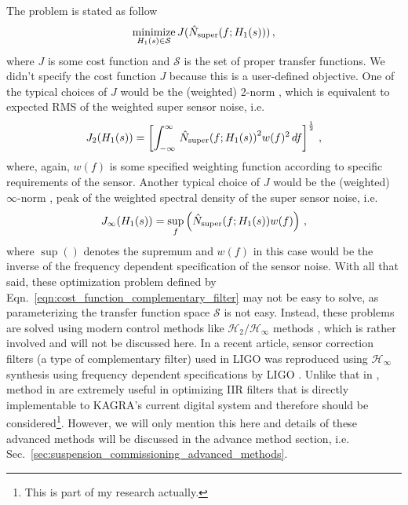 The problem is stated as follow
\begin{equation}
	\minimize_{H_1(s)\in\mathcal{S}} J(\hat{N}_\mathrm{super}\mleft(f; H_1(s)\mright))\,,
	\label{eqn:cost_function_complementary_filter}
\end{equation}
where $J$ is some cost function and $\mathcal{S}$ is the set of proper transfer functions.
We didn't specify the cost function $J$ because this is a user-defined objective.
One of the typical choices of $J$ would be the (weighted) 2-norm \cite{norms_for_signals_and_systems}, which is equivalent to expected RMS of the weighted super sensor noise, i.e.
\begin{equation}
	J_2\mleft( H_1(s) \mright) = \left[\int_{-\infty}^\infty \, \hat{N}_\mathrm{super}\mleft(f;H_1(s)\mright)^2 w(f)^2\, df\right]^\frac{1}{2}\,,
\end{equation}
where, again, $w(f)$ is some specified weighting function according to specific requirements of the sensor.
Another typical choice of $J$ would be the (weighted) $\infty$-norm \cite{norms_for_signals_and_systems}, peak of the weighted spectral density of the super sensor noise, i.e.
\begin{equation}
	J_\infty\mleft(H_1(s)\mright) = \sup_{f} \left(\hat{N}_\mathrm{super}\mleft(f;H_1(s)\mright)w(f) \right) \,,
\end{equation}
where $\sup()$ denotes the supremum and $w(f)$ in this case would be the inverse of the frequency dependent specification of the sensor noise.
With all that said, these optimization problem defined by Eqn.~\eqref{eqn:cost_function_complementary_filter} may not be easy to solve, as parameterizing the transfer function space $\mathcal{S}$ is not easy.
Instead, these problems are solved using modern control methods like $\mathcal{H}_2/\mathcal{H}_\infty$ methods \cite{feedback_control_theory}, which is rather involved and will not be discussed here.
In a recent article, sensor correction filters (a type of complementary filter) used in LIGO \cite{low_frequency_vibration_isolation_hua} was reproduced using $\mathcal{H}_\infty$ synthesis using frequency dependent specifications by LIGO \cite{complementary_filters_shaping_using_h_infinity_synthesis}.
Unlike that in \cite{low_frequency_vibration_isolation_hua}, method in \cite{complementary_filters_shaping_using_h_infinity_synthesis} are extremely useful in optimizing IIR filters that is directly implementable to KAGRA's current digital system and therefore should be considered\footnote{This is part of my research actually.}.
However, we will only mention this here and details of these advanced methods will be discussed in the advance method section, i.e. Sec.~\ref{sec:suspension_commissioning_advanced_methods}.

